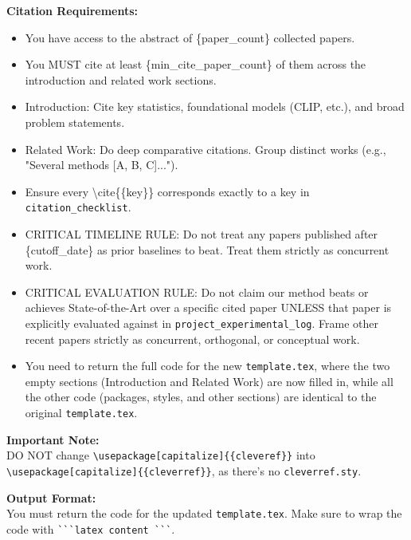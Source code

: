 \vspace{1em}
\noindent\textbf{Citation Requirements:}
\begin{itemize}
    \item You have access to the abstract of \{paper\_count\} collected papers.
    \item You MUST cite at least \{min\_cite\_paper\_count\} of them across the introduction and related work sections.
    \item Introduction: Cite key statistics, foundational models (CLIP, etc.), and broad problem statements.
    \item Related Work: Do deep comparative citations. Group distinct works (e.g., "Several methods [A, B, C]...").
    \item Ensure every \textbackslash{}cite\{\{key\}\} corresponds exactly to a key in \texttt{citation\_checklist}.
    \item CRITICAL TIMELINE RULE: Do not treat any papers published after \{cutoff\_date\} as prior baselines to beat. Treat them strictly as concurrent work.
    \item CRITICAL EVALUATION RULE: Do not claim our method beats or achieves State-of-the-Art over a specific cited paper UNLESS that paper is explicitly evaluated against in \texttt{project\_experimental\_log}. Frame other recent papers strictly as concurrent, orthogonal, or conceptual work.
    \item You need to return the full code for the new \texttt{template.tex}, where the two empty sections (Introduction and Related Work) are now filled in, while all the other code (packages, styles, and other sections) are identical to the original \texttt{template.tex}.
\end{itemize}

\vspace{1em}
\noindent\textbf{Important Note:}\\
DO NOT change \texttt{\textbackslash{}usepackage[capitalize]\{\{cleveref\}\}} into \texttt{\textbackslash{}usepackage[capitalize]\{\{cleverref\}\}}, as there's no \texttt{cleverref.sty}.

\vspace{1em}
\noindent\textbf{Output Format:}\\
You must return the code for the updated \texttt{template.tex}. Make sure to wrap the code with \verb|```latex content ```|.
